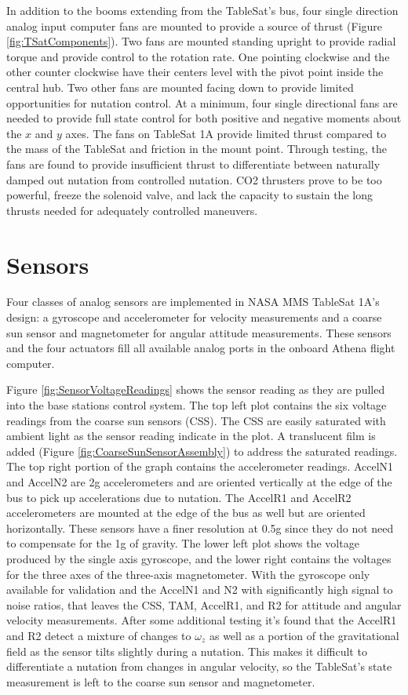 In addition to the booms extending from the TableSat's bus, four single direction analog input computer fans are mounted to provide a source of thrust (Figure \ref{fig:TSatComponents}).  Two fans are mounted standing upright to provide radial torque and provide control to the rotation rate.  One pointing clockwise and the other counter clockwise have their centers level with the pivot point inside the central hub.  Two other fans are mounted facing down to provide limited opportunities for nutation control.  At a minimum, four single directional fans are needed to provide full state control for both positive and negative moments about the $x$ and $y$ axes.  The fans on TableSat 1A provide limited thrust compared to the mass of the TableSat and friction in the mount point.  Through testing, the fans are found to provide insufficient thrust to differentiate between naturally damped out nutation from controlled nutation.  CO2 thrusters prove to be too powerful, freeze the solenoid valve, and lack the capacity to sustain the long thrusts needed for adequately controlled maneuvers.

\section{Sensors}
\label{sec:Sensors}

Four classes of analog sensors are implemented in NASA MMS TableSat 1A's design: a gyroscope and accelerometer for velocity measurements and a coarse sun sensor and magnetometer for angular attitude measurements.  These sensors and the four actuators fill all available analog ports in the onboard Athena flight computer.

Figure \ref{fig:SensorVoltageReadings} shows the sensor reading as they are pulled into the base stations control system.  The top left plot contains the six voltage readings from the coarse sun sensors (CSS).  The CSS are easily saturated with ambient light as the sensor reading indicate in the plot.  A translucent film is added (Figure \ref{fig:CoarseSunSensorAssembly}) to address the saturated readings.  The top right portion of the graph contains the accelerometer readings.  AccelN1 and AccelN2 are 2g accelerometers and are oriented vertically at the edge of the bus to pick up accelerations due to nutation.  The AccelR1 and AccelR2 accelerometers are mounted at the edge of the bus as well but are oriented horizontally.  These sensors have a finer resolution at 0.5g since they do not need to compensate for the 1g of gravity.  The lower left plot shows the voltage produced by the single axis gyroscope, and the lower right contains the voltages for the three axes of the three-axis magnetometer.  With the gyroscope only available for validation and the AccelN1 and N2 with significantly high signal to noise ratios, that leaves the CSS, TAM, AccelR1, and R2 for attitude and angular velocity measurements.  After some additional testing it's found that the AccelR1 and R2 detect a mixture of changes to $\omega_z$ as well as a portion of the gravitational field as the sensor tilts slightly during a nutation.  This makes it difficult to differentiate a nutation from changes in angular velocity, so the TableSat's state measurement is left to the coarse sun sensor and magnetometer.

